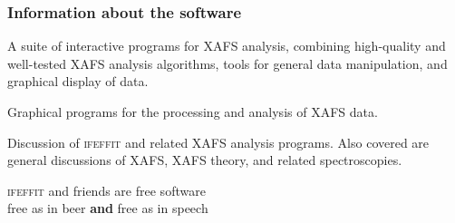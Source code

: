 \documentclass[10pt, xcolor=x11names, compress]{beamer}
\begin{document}
\begin{frame}
  \frametitle{Information about the software}
  \begin{description}[Ifeffit]
  \item[Ifeffit] A suite of interactive programs for XAFS analysis,
    combining high-quality and well-tested XAFS analysis algorithms,
    tools for general data manipulation, and graphical display of
    data.\\
  \item[Athena \& Artemis] Graphical programs for the processing and
    analysis of XAFS data.\\
  \item[The Ifeffit mailing list] Discussion of \textsc{ifeffit} and
    related XAFS analysis programs.  Also covered are general
    discussions of XAFS, XAFS theory, and related
    spectroscopies.\\
  \end{description}

  \begin{block}{}
    \begin{center}
      \textsc{ifeffit} and friends are \alert{free} software\\
      \alert{free} as in beer \textbf{and} \alert{free} as in speech
    \end{center}
  \end{block}

\end{frame}
\end{document}
